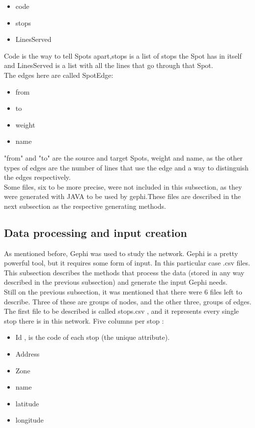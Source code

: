 \documentclass[12pt]{article}
\begin{document}
\begin{multicols}{2}
\begin{itemize}
	\item code
	\item stops
	\item LinesServed
\end{itemize}
	
Code is the way to tell Spots apart,stops is a list of stops the Spot has in itself and LinesServed is a list with all the lines that go through that Spot.\\ 
The edges here are called SpotEdge:\\

\begin{itemize}
    \item from
    \item to
    \item weight
    \item name
\end{itemize}

"from" and "to" are the source and target Spots, weight and name, as the other types of edges are the number of lines that use the edge and a way to distinguish the edges respectively.\\
Some files, six to be more precise, were not included in this subsection, as they were generated with JAVA to be used by gephi.These files are described in the next subsection as the respective generating methods.

\subsection{Data processing and input creation}
	
	As mentioned before, Gephi was used to study the network. Gephi is a pretty powerful tool, but it requires some form of input. In this particular case .csv files. This subsection describes the methods that process the data (stored in any way described in the previous subsection) and generate the input Gephi needs.\\
	Still on the previous subsection, it was mentioned that there were 6 files left to describe. Three of these are groups of nodes, and the other three, groups of edges.\\
	
	
The first file to be described is called stops.csv , and it represents every single stop there is in this network. Five columns per stop :
	
	\begin{itemize}
		\item Id , is the code of each stop (the unique attribute).
		\item Address
		\item Zone
		\item name
		\item latitude
		\item longitude
	\end{itemize}
	

\end{multicols}
\end{document}
